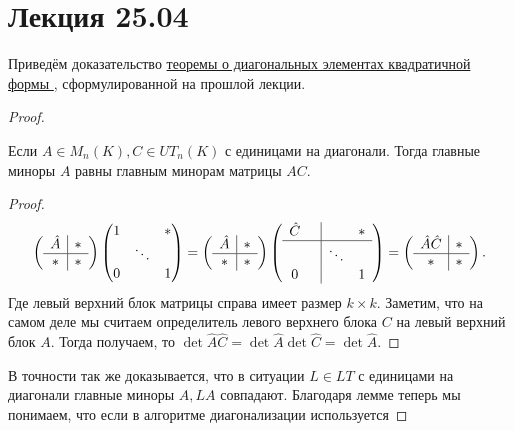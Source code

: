 \section{Лекция 25.04}
Приведём доказательство \hyperref[thm:Формула для диагональных элементов квадратичной формы]{
    теоремы о диагональных элементах квадратичной формы
}, сформулированной на прошлой лекции.
\begin{proof}
    \begin{lemma}
        Если $A\in M_n(K), C\in UT_n(K)$ с единицами на диагонали. Тогда главные миноры
        $A$ равны главным минорам матрицы $AC$.
    \end{lemma}
    \begin{proof}
        \[
        \left(\begin{array}{c|c}
                \hat{A} & * \\
                \hline
                 *& *
        \end{array}\right)
        \begin{pmatrix}
            1 & & *\\
              &\ddots&\\
            0 & & 1
        \end{pmatrix} =
        \left(\begin{array}{c|c}
                \hat{A} & * \\
                \hline
                * & *
        \end{array}\right)
        \left(\begin{array}{cc|cc}
                \hat{C} & & &* \\
                \hline
                &&\ddots&\\
                0&&&1
        \end{array}\right)=
        \left(\begin{array}{c|c}
                \hat{A} \hat{C} & * \\
                \hline
                 * & *
        \end{array}\right)
        .\] 
        Где левый верхний блок матрицы справа имеет размер $k\times k$.
        Заметим, что на самом деле мы считаем определитель левого верхнего блока $C$ на левый верхний блок $A$.
        Тогда получаем, то  $\det \hat{A} \hat{C} = \det \hat{A} \det \hat{C} = \det \hat{A}$.
    \end{proof}
    В точности так же доказывается, что в ситуации $L\in LT$ с единицами на диагонали главные миноры
    $A, LA$ совпадают.
    Благодаря лемме теперь мы понимаем, что если в алгоритме диагонализации используется

\end{proof}
